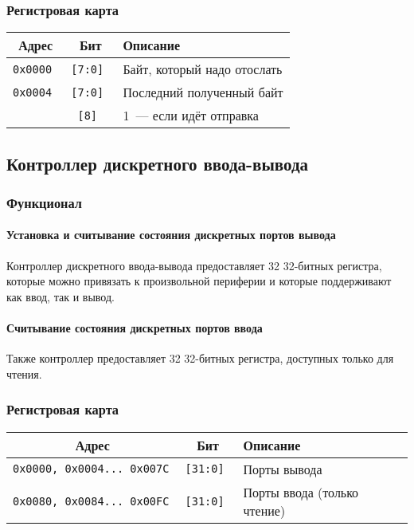 \documentclass[12pt, a4paper] {ncc}
\begin{document}
\subsubsection{Регистровая карта}

\begin{tabular}{|c|c|l|}
        \hline
        \bf Адрес & \bf Бит & \bf Описание \\
        \hline
        \tt 0x0000 & \tt [7:0] & Байт, который надо отослать \\
        \hline
        \tt 0x0004 & \tt [7:0] & Последний полученный байт \\
                   & \tt [8] & 1~--- если идёт отправка \\
        \hline
\end{tabular}

\subsection{Контроллер дискретного ввода-вывода}

\subsubsection{Функционал}

\paragraph{Установка и считывание состояния дискретных портов вывода} Контроллер дискретного ввода-вывода предоставляет 32 32-битных регистра, которые можно привязать к произвольной периферии и которые поддерживают как ввод, так и вывод. 

\paragraph{Считывание состояния дискретных портов ввода} Также контроллер предоставляет 32 32-битных регистра, доступных только для чтения.

\subsubsection{Регистровая карта}

\begin{tabular}{|c|c|l|}
        \hline
        \bf Адрес & \bf Бит & \bf Описание \\
        \hline
        \tt 0x0000, 0x0004... 0x007C & \tt [31:0] & Порты вывода \\
        \hline
        \tt 0x0080, 0x0084... 0x00FC & \tt [31:0] & Порты ввода (только чтение) \\
        \hline
\end{tabular}
\end{document}
